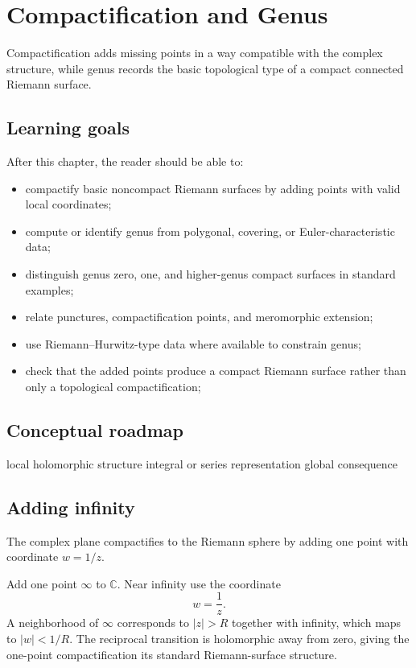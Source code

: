 \chapter{Compactification and Genus}
\label{ch:iv26}

Compactification adds missing points in a way compatible with the complex structure, while genus records the basic topological type of a compact connected Riemann surface.

\section*{Learning goals}
After this chapter, the reader should be able to:
\begin{itemize}
\item compactify basic noncompact Riemann surfaces by adding points with valid local coordinates;
\item compute or identify genus from polygonal, covering, or Euler-characteristic data;
\item distinguish genus zero, one, and higher-genus compact surfaces in standard examples;
\item relate punctures, compactification points, and meromorphic extension;
\item use Riemann--Hurwitz-type data where available to constrain genus;
\item check that the added points produce a compact Riemann surface rather than only a topological compactification;
\end{itemize}
\section*{Conceptual roadmap}
\volroadmap
  {local holomorphic structure}
  {integral or series representation}
  {global consequence}

\section{Adding infinity}
The complex plane compactifies to the Riemann sphere by adding one point with coordinate $w=1/z$.

\begin{example}\label{ex:iv26-expand-01}
Add one point \(\infty\) to \(\mathbb C\). Near infinity use the coordinate
\[
w=\frac1z.
\]
A neighborhood of \(\infty\) corresponds to \(|z|>R\) together with infinity, which maps to \(|w|<1/R\). The reciprocal transition is holomorphic away from zero, giving the one-point compactification its standard Riemann-surface structure.
\end{example}
